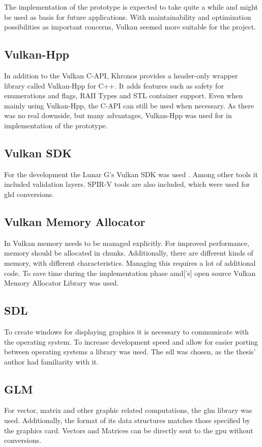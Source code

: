 The implementation of the prototype is expected to take quite a while and might be used as basis for future applications. With maintainability and optimization possibilities as important concerns, Vulkan seemed more suitable for the project. 


\subsection{Vulkan-Hpp}
In addition to the Vulkan C-API, Khronos provides a header-only wrapper library called Vulkan-Hpp for C++. It adds features such as safety for enumerations and flags, RAII Types and STL container support. Even when mainly using Vulkan-Hpp, the C-API can still be used when necessary. As there was no real downside, but many advantages, Vulkan-Hpp was used for in implementation of the prototype.


\subsection{Vulkan SDK}
For the development the Lunar G's Vulkan SDK was used \cite{lunarg:vulkansdk}. Among other tools it included validation layers. SPIR-V tools are also included, which were used for \gls{glsl} conversions.

\subsection{Vulkan Memory Allocator}
In Vulkan memory needs to be managed explicitly. For improved performance, memory should be allocated in chunks. Additionally, there are different kinds of memory, with different characteristics. Managing this requires a lot of additional code. To save time during the implementation phase \gls{amd}['s] open source Vulkan Memory Allocator Library \cite{amd:vulkanmemoryallocator} was used.


\subsection{SDL}
To create windows for displaying graphics it is necessary to communicate with the operating system. To increase development speed and allow for easier porting between operating systems a library was used. The \gls{sdl} \cite{sdl} was chosen, as the thesis' author had familiarity with it.

\subsection{GLM}
For vector, matrix and other graphic related computations, the \gls{glm} library \cite{glm} was used. Additionally, the format of its data structures matches those specified by the graphics card. Vectors and Matrices can be directly sent to the \gls{gpu} without conversions.


